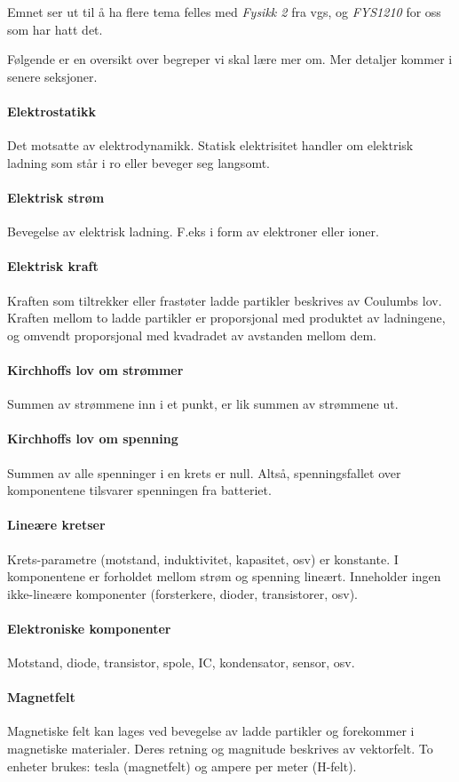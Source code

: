 Emnet ser ut til å ha flere tema felles med \emph{Fysikk 2} fra vgs, og
\emph{FYS1210} for oss som har hatt det.

Følgende er en oversikt over begreper vi skal lære mer om.
Mer detaljer kommer i senere seksjoner.

\paragraph{Elektrostatikk}
  Det motsatte av elektrodynamikk.
  Statisk elektrisitet handler om elektrisk ladning som står i ro
  eller beveger seg langsomt.
\paragraph{Elektrisk strøm}
  Bevegelse av elektrisk ladning.
  F.eks i form av elektroner eller ioner.
\paragraph{Elektrisk kraft}
  Kraften som tiltrekker eller frastøter ladde partikler beskrives av
  Coulumbs lov.
  Kraften mellom to ladde partikler er proporsjonal med produktet av ladningene,
  og omvendt proporsjonal med kvadradet av avstanden mellom dem.
\paragraph{Kirchhoffs lov om strømmer}
  Summen av strømmene inn i et punkt, er lik summen av strømmene ut.
\paragraph{Kirchhoffs lov om spenning}
  Summen av alle spenninger i en krets er null.
  Altså, spenningsfallet over komponentene tilsvarer spenningen fra batteriet.
\paragraph{Lineære kretser}
  Krets-parametre (motstand, induktivitet, kapasitet, osv) er konstante.
  I komponentene er forholdet mellom strøm og spenning lineært.
  Inneholder ingen ikke-lineære komponenter (forsterkere, dioder,
  transistorer, osv).
\paragraph{Elektroniske komponenter}
  Motstand, diode, transistor, spole, IC, kondensator, sensor, osv.
\paragraph{Magnetfelt}
  Magnetiske felt kan lages ved bevegelse av ladde partikler og
  forekommer i magnetiske materialer.
  Deres retning og magnitude beskrives av vektorfelt.
  To enheter brukes: tesla (magnetfelt) og ampere per meter (H-felt).
